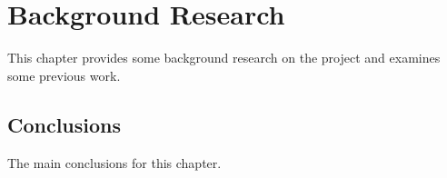 \chapter{Background Research}\label{ch:Background}

This chapter provides some background research on the project and examines some previous work.

\section{Conclusions}

The main conclusions for this chapter.


